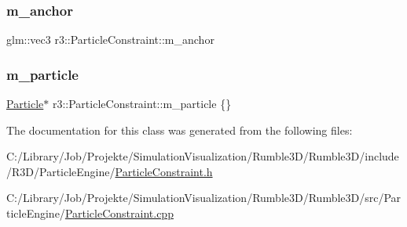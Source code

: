 \subsubsection{\texorpdfstring{m\+\_\+anchor}{m\_anchor}}
{\footnotesize\ttfamily glm\+::vec3 r3\+::\+Particle\+Constraint\+::m\+\_\+anchor\hspace{0.3cm}{\ttfamily [protected]}}

\mbox{\label{classr3_1_1_particle_constraint_ad6a80699b1e0579c4a307f3a7ac49d26}} 
\subsubsection{\texorpdfstring{m\+\_\+particle}{m\_particle}}
{\footnotesize\ttfamily \mbox{\hyperlink{classr3_1_1_particle}{Particle}}$\ast$ r3\+::\+Particle\+Constraint\+::m\+\_\+particle \{\}\hspace{0.3cm}{\ttfamily [protected]}}



The documentation for this class was generated from the following files\+:\begin{DoxyCompactItemize}
\item 
C\+:/\+Library/\+Job/\+Projekte/\+Simulation\+Visualization/\+Rumble3\+D/\+Rumble3\+D/include/\+R3\+D/\+Particle\+Engine/\mbox{\hyperlink{_particle_constraint_8h}{Particle\+Constraint.\+h}}\item 
C\+:/\+Library/\+Job/\+Projekte/\+Simulation\+Visualization/\+Rumble3\+D/\+Rumble3\+D/src/\+Particle\+Engine/\mbox{\hyperlink{_particle_constraint_8cpp}{Particle\+Constraint.\+cpp}}\end{DoxyCompactItemize}
